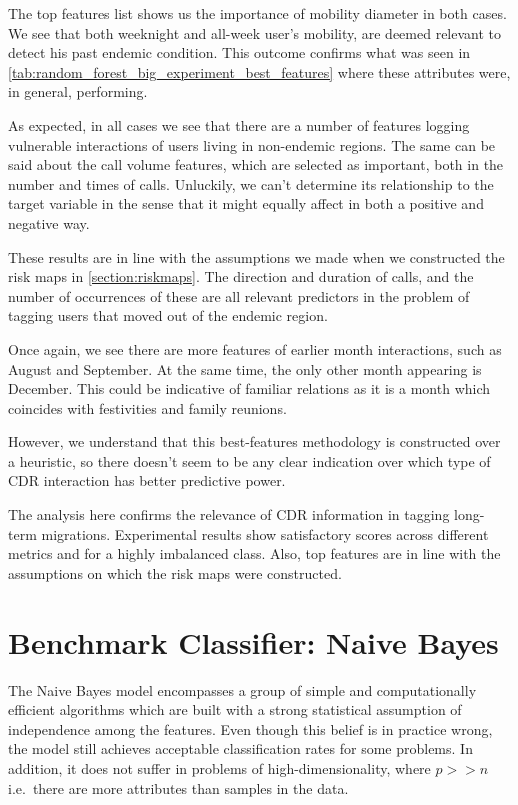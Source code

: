 The top features list shows us the importance of mobility diameter in both cases.
We see that both weeknight and all-week user's mobility, are deemed relevant to detect his past endemic condition.
This outcome confirms what was seen in \cref{tab:random_forest_big_experiment_best_features} where these attributes were, in general, performing.

As expected, in all cases we see that there are a number of features logging vulnerable interactions of users living in non-endemic regions.
The same can be said about the call volume features, which are selected as important, both in the number and times of calls.
Unluckily, we can't determine its relationship to the target variable in the sense that it might equally affect in both a positive and negative way.

These results are in line with the assumptions we made when we constructed the risk maps in \cref{section:riskmaps}.
The direction and duration of calls, and the number of occurrences of these are all relevant predictors in the problem of tagging users that moved out of the endemic region.

Once again, we see there are more features of earlier month interactions, such as August and September.
At the same time, the only other month appearing is December.
This could be indicative of familiar relations as it is a month which coincides with festivities and family reunions.

However, we understand that this best-features methodology is constructed over a heuristic, so there doesn't seem to be any clear indication over which type of CDR interaction has better predictive power.

The analysis here confirms the relevance of CDR information in tagging long-term migrations.
Experimental results show satisfactory scores across different metrics and for a highly imbalanced class.
Also, top features are in line with the assumptions on which the risk maps were constructed.


\section{Benchmark Classifier: Naive Bayes}\label{section:naive_bayes}

The Naive Bayes model encompasses a group of simple and computationally efficient algorithms which are built with a strong statistical assumption of independence among the features.
Even though this belief is in practice wrong, the model still achieves acceptable classification rates for some problems.
In addition, it does not suffer in problems of high-dimensionality, where $p >> n$ i.e.\ there are more attributes than samples in the data.

